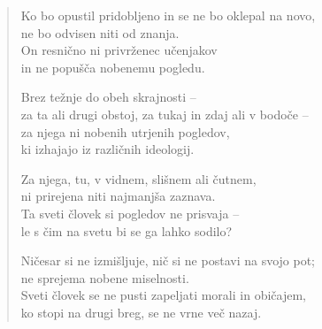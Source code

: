 
\clearpage
\begin{verse}

Ko bo opustil pridobljeno in se ne bo oklepal na novo,\\
ne bo odvisen niti od znanja.\\
On resnično ni privrženec učenjakov\\
in ne popušča nobenemu pogledu.

Brez težnje do obeh skrajnosti --\\
za ta ali drugi obstoj, za tukaj in zdaj ali v bodoče --\\
za njega ni nobenih utrjenih pogledov,\\
ki izhajajo iz različnih ideologij.

Za njega, tu, v vidnem, slišnem ali čutnem,\\
ni prirejena niti najmanjša zaznava.\\
Ta sveti človek si pogledov ne prisvaja --\\
le s čim na svetu bi se ga lahko sodilo?

Ničesar si ne izmišljuje, nič si ne postavi na svojo pot;\\
ne sprejema nobene miselnosti.\\
Sveti človek se ne pusti zapeljati morali in običajem,\\
ko stopi na drugi breg, se ne vrne več nazaj.

\end{verse}

